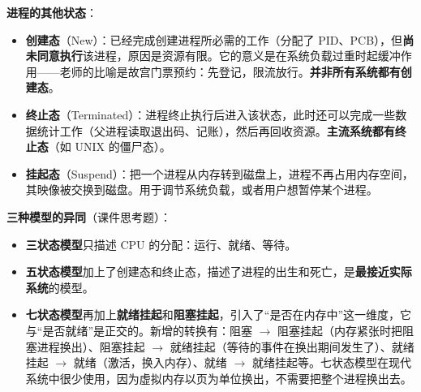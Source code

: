 \textbf{进程的其他状态}：
\begin{itemize}
    \item \textbf{创建态}（New）：已经完成创建进程所必需的工作（分配了 PID、PCB），但\textbf{尚未同意执行}该进程，原因是资源有限。它的意义是在系统负载过重时起缓冲作用——老师的比喻是故宫门票预约：先登记，限流放行。\textbf{并非所有系统都有创建态}。
    \item \textbf{终止态}（Terminated）：进程终止执行后进入该状态，此时还可以完成一些数据统计工作（父进程读取退出码、记账），然后再回收资源。\textbf{主流系统都有终止态}（如 UNIX 的僵尸态）。
    \item \textbf{挂起态}（Suspend）：把一个进程从内存转到磁盘上，进程不再占用内存空间，其映像被交换到磁盘。用于调节系统负载，或者用户想暂停某个进程。
\end{itemize}

\textbf{三种模型的异同}（课件思考题）：
\begin{itemize}
    \item \textbf{三状态模型}只描述 CPU 的分配：运行、就绪、等待。
    \item \textbf{五状态模型}加上了创建态和终止态，描述了进程的出生和死亡，是\textbf{最接近实际系统}的模型。
    \item \textbf{七状态模型}再加上\textbf{就绪挂起}和\textbf{阻塞挂起}，引入了“是否在内存中”这一维度，它与“是否就绪”是正交的。新增的转换有：阻塞 $\to$ 阻塞挂起（内存紧张时把阻塞进程换出）、阻塞挂起 $\to$ 就绪挂起（等待的事件在换出期间发生了）、就绪挂起 $\to$ 就绪（激活，换入内存）、就绪 $\to$ 就绪挂起等。七状态模型在现代系统中很少使用，因为虚拟内存以页为单位换出，不需要把整个进程换出去。
\end{itemize}

